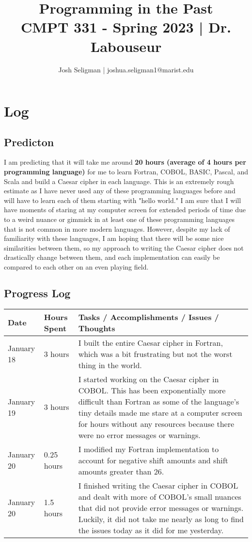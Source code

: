 \documentclass[letterpaper, 10pt, DIV=13]{scrartcl}
\title {
	\normalfont
	\huge{Programming in the Past} \\
	\vspace{10pt}
	\large{CMPT 331 - Spring 2023 | Dr. Labouseur}
}
\author{\normalfont Josh Seligman | joshua.seligman1@marist.edu}
\numberwithin{equation}{section}
\numberwithin{figure}{section}
\numberwithin{table}{section}
\begin{document}
\maketitle

\section{Log}
\subsection{Predicton}
I am predicting that it will take me around \textbf{20 hours (average of 4 hours per programming language)} for me to learn Fortran, COBOL, BASIC, Pascal, and Scala and build a Caesar cipher in each language. This is an extremely rough estimate as I have never used any of these programming languages before and will have to learn each of them starting with "hello world." I am sure that I will have moments of staring at my computer screen for extended periods of time due to a weird nuance or gimmick in at least one of these programming languages that is not common in more modern languages. However, despite my lack of familiarity with these languages, I am hoping that there will be some nice similarities between them, so my approach to writing the Caesar cipher does not drastically change between them, and each implementation can easily be compared to each other on an even playing field.

\subsection{Progress Log}
\begin{center}
	\begin{tabular}{|p{1in}|p{1in}|p{4in}|}
		\hline
		Date & Hours Spent & Tasks / Accomplishments / Issues / Thoughts \\
		\hline
		January 18 & 3 hours & I built the entire Caesar cipher in Fortran, which was a bit frustrating but not the worst thing in the world.\\
		\hline
		January 19 & 3 hours & I started working on the Caesar cipher in COBOL. This has been exponentially more difficult than Fortran as some of the language's tiny details made me stare at a computer screen for hours without any resources because there were no error messages or warnings.\\
		\hline
		January 20 & 0.25 hours & I modified my Fortran implementation to account for negative shift amounts and shift amounts greater than 26. \\
		\hline
		January 20 & 1.5 hours & I finished writing the Caesar cipher in COBOL and dealt with more of COBOL's small nuances that did not provide error messages or warnings. Luckily, it did not take me nearly as long to find the issues today as it did for me yesterday. \\
		\hline
	\end{tabular}
\end{center}
\end{document}
